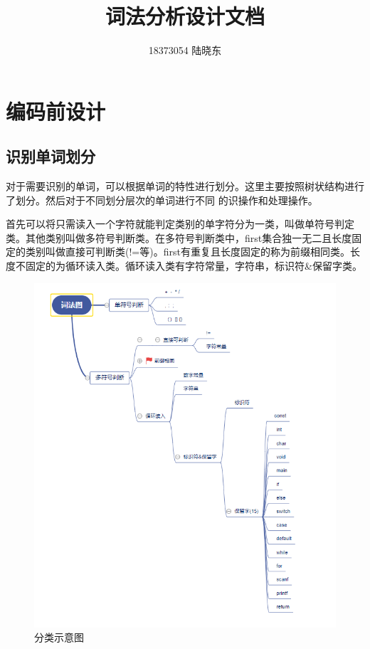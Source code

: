 \documentclass{ctexart}
\title{\Huge 词法分析设计文档}
\author{18373054 陆晓东}
\begin{document}
	\maketitle
	\newpage
	\section{编码前设计}
	\subsection{识别单词划分}
	对于需要识别的单词，可以根据单词的特性进行划分。这里主要按照树状结构进行了划分。然后对于不同划分层次的单词进行不同
	的识操作和处理操作。\par
	首先可以将只需读入一个字符就能判定类别的单字符分为一类，叫做单符号判定类。其他类别叫做多符号判断类。在多符号判断类中，first集合独一无二且长度固定的类别叫做直接可判断类(!=等)。first有重复且长度固定的称为前缀相同类。长度不固定的为循环读入类。循环读入类有字符常量，字符串，标识符\&保留字类。
	\begin{figure}[htbp]
		\centering
		\includegraphics[width=0.5\linewidth]{pics/cf.PNG}
		\caption{分类示意图} \label{figs:cf}
	\end{figure}
\end{document}
